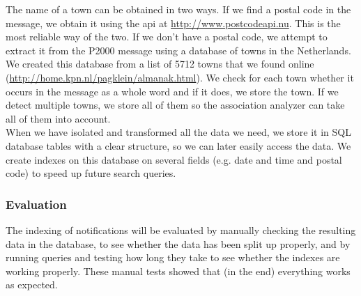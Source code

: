 The name of a town can be obtained in two ways. If we find a postal code in the message, we obtain it using the api at \url{http://www.postcodeapi.nu}. This is the most reliable way of the two. If we don't have a postal code, we attempt to extract it from the P2000 message using a database of towns in the Netherlands. We created this database from a list of 5712 towns that we found online (\url{http://home.kpn.nl/pagklein/almanak.html}). We check for each town whether it occurs in the message as a whole word and if it does, we store the town. If we detect multiple towns, we store all of them so the association analyzer can take all of them into account.\\

When we have isolated and transformed all the data we need, we store it in SQL database tables with a clear structure, so we can later easily access the data. We create indexes on this database on several fields (e.g. date and time and postal code) to speed up future search queries.
\subsubsection*{Evaluation}
The indexing of notifications will be evaluated by manually checking the resulting data in the database, to see whether the data has been split up properly, and by running queries and testing how long they take to see whether the indexes are working properly. These manual tests showed that (in the end) everything works as expected.